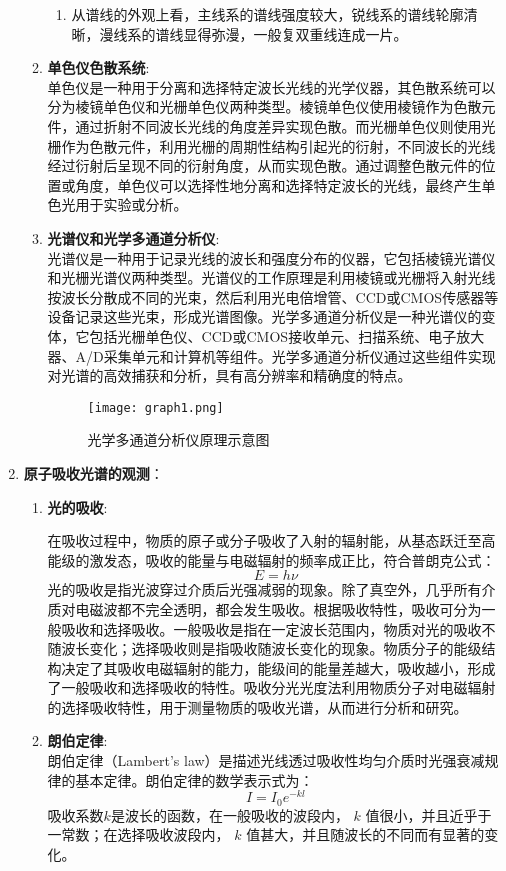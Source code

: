 \documentclass[dvipsnames, svgnames,a4paper,11pt]{article}
\begin{document}
\begin{enumerate}
\begin{enumerate}
\begin{enumerate}
							\item 从谱线的外观上看，主线系的谱线强度较大，锐线系的谱线轮廓清晰，漫线系的谱线显得弥漫，一般复双重线连成一片。
						\end{enumerate}
						
				\item \textbf{单色仪色散系统}:\\
					单色仪是一种用于分离和选择特定波长光线的光学仪器，其色散系统可以分为棱镜单色仪和光栅单色仪两种类型。棱镜单色仪使用棱镜作为色散元件，通过折射不同波长光线的角度差异实现色散。而光栅单色仪则使用光栅作为色散元件，利用光栅的周期性结构引起光的衍射，不同波长的光线经过衍射后呈现不同的衍射角度，从而实现色散。通过调整色散元件的位置或角度，单色仪可以选择性地分离和选择特定波长的光线，最终产生单色光用于实验或分析。
				
				\item \textbf{光谱仪和光学多通道分析仪}:\\
					光谱仪是一种用于记录光线的波长和强度分布的仪器，它包括棱镜光谱仪和光栅光谱仪两种类型。光谱仪的工作原理是利用棱镜或光栅将入射光线按波长分散成不同的光束，然后利用光电倍增管、CCD或CMOS传感器等设备记录这些光束，形成光谱图像。光学多通道分析仪是一种光谱仪的变体，它包括光栅单色仪、CCD或CMOS接收单元、扫描系统、电子放大器、A/D采集单元和计算机等组件。光学多通道分析仪通过这些组件实现对光谱的高效捕获和分析，具有高分辨率和精确度的特点。
					
					\begin{figure}[htbp]
						\centering
						\texttt{[image: graph1.png]}
						\caption{光学多通道分析仪原理示意图}
						\label{fig:graph1}
					\end{figure}
					
			\end{enumerate}
			
			
			
		\item \textbf{原子吸收光谱的观测}：
			\begin{enumerate}
				\item \textbf{光的吸收}:
					
					在吸收过程中，物质的原子或分子吸收了入射的辐射能，从基态跃迁至高能级的激发态，吸收的能量与电磁辐射的频率成正比，符合普朗克公式：
					\[ E = h\nu \]
					光的吸收是指光波穿过介质后光强减弱的现象。除了真空外，几乎所有介质对电磁波都不完全透明，都会发生吸收。根据吸收特性，吸收可分为一般吸收和选择吸收。一般吸收是指在一定波长范围内，物质对光的吸收不随波长变化；选择吸收则是指吸收随波长变化的现象。物质分子的能级结构决定了其吸收电磁辐射的能力，能级间的能量差越大，吸收越小，形成了一般吸收和选择吸收的特性。吸收分光光度法利用物质分子对电磁辐射的选择吸收特性，用于测量物质的吸收光谱，从而进行分析和研究。
				\item \textbf{朗伯定律}:\\
					朗伯定律（Lambert's law）是描述光线透过吸收性均匀介质时光强衰减规律的基本定律。朗伯定律的数学表示式为：
					\[ I = I_0 e^{-kl} \]
					吸收系数$k$是波长的函数，在一般吸收的波段内， $k$ 值很小，并且近乎于一常数；在选择吸收波段内， $k$ 值甚大，并且随波长的不同而有显著的变化。
					

\end{enumerate}
\end{enumerate}
\end{document}
